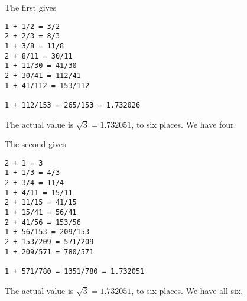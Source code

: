 \documentclass[11pt, oneside]{article}
\begin{document}
The first gives
\begin{verbatim}
1 + 1/2 = 3/2
2 + 2/3 = 8/3
1 + 3/8 = 11/8
2 + 8/11 = 30/11
1 + 11/30 = 41/30
2 + 30/41 = 112/41
1 + 41/112 = 153/112

1 + 112/153 = 265/153 = 1.732026
\end{verbatim}

The actual value is $\sqrt{3} = 1.732051$, to six places.  We have four.

The second gives
\begin{verbatim}
2 + 1 = 3
1 + 1/3 = 4/3
2 + 3/4 = 11/4
1 + 4/11 = 15/11
2 + 11/15 = 41/15
1 + 15/41 = 56/41
2 + 41/56 = 153/56
1 + 56/153 = 209/153
2 + 153/209 = 571/209
1 + 209/571 = 780/571

1 + 571/780 = 1351/780 = 1.732051
\end{verbatim}

The actual value is $\sqrt{3} = 1.732051$, to six places.  We have all six.
\end{document}
